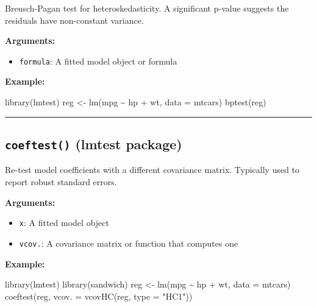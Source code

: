 \documentclass[
  letterpaper,
  DIV=11,
  numbers=noendperiod]{scrreprt}
\newenvironment{Shaded}{\begin{snugshade}}{\end{snugshade}}
\newcommand{\AttributeTok}[1]{\textcolor[rgb]{0.40,0.45,0.13}{#1}}
\newcommand{\FunctionTok}[1]{\textcolor[rgb]{0.28,0.35,0.67}{#1}}
\newcommand{\NormalTok}[1]{\textcolor[rgb]{0.00,0.23,0.31}{#1}}
\newcommand{\OtherTok}[1]{\textcolor[rgb]{0.00,0.23,0.31}{#1}}
\newcommand{\SpecialCharTok}[1]{\textcolor[rgb]{0.37,0.37,0.37}{#1}}
\newcommand{\StringTok}[1]{\textcolor[rgb]{0.13,0.47,0.30}{#1}}
\providecommand{\tightlist}{%
  \setlength{\itemsep}{0pt}\setlength{\parskip}{0pt}}
\begin{document}
Breusch-Pagan test for heteroskedasticity. A significant p-value
suggests the residuals have non-constant variance.

\textbf{Arguments:}

\begin{itemize}
\tightlist
\item
  \texttt{formula}: A fitted model object or formula
\end{itemize}

\textbf{Example:}

\begin{Shaded}
\begin{Highlighting}[]
\FunctionTok{library}\NormalTok{(lmtest)}
\NormalTok{reg }\OtherTok{\textless{}{-}} \FunctionTok{lm}\NormalTok{(mpg }\SpecialCharTok{\textasciitilde{}}\NormalTok{ hp }\SpecialCharTok{+}\NormalTok{ wt, }\AttributeTok{data =}\NormalTok{ mtcars)}
\FunctionTok{bptest}\NormalTok{(reg)}
\end{Highlighting}
\end{Shaded}

\begin{center}\rule{0.5\linewidth}{0.5pt}\end{center}

\subsection{\texorpdfstring{\texttt{coeftest()} (lmtest
package)}{coeftest() (lmtest package)}}\label{coeftest-lmtest-package}

Re-test model coefficients with a different covariance matrix. Typically
used to report robust standard errors.

\textbf{Arguments:}

\begin{itemize}
\tightlist
\item
  \texttt{x}: A fitted model object
\item
  \texttt{vcov.}: A covariance matrix or function that computes one
\end{itemize}

\textbf{Example:}

\begin{Shaded}
\begin{Highlighting}[]
\FunctionTok{library}\NormalTok{(lmtest)}
\FunctionTok{library}\NormalTok{(sandwich)}
\NormalTok{reg }\OtherTok{\textless{}{-}} \FunctionTok{lm}\NormalTok{(mpg }\SpecialCharTok{\textasciitilde{}}\NormalTok{ hp }\SpecialCharTok{+}\NormalTok{ wt, }\AttributeTok{data =}\NormalTok{ mtcars)}
\FunctionTok{coeftest}\NormalTok{(reg, }\AttributeTok{vcov. =} \FunctionTok{vcovHC}\NormalTok{(reg, }\AttributeTok{type =} \StringTok{"HC1"}\NormalTok{))}
\end{Highlighting}
\end{Shaded}
\end{document}

